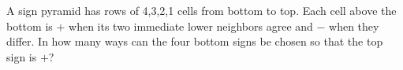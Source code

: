 A sign pyramid has rows of 4,3,2,1 cells from bottom to top. Each cell above the bottom is $+$ when its two immediate lower neighbors agree and $-$ when they differ. In how many ways can the four bottom signs be chosen so that the top sign is $+$?
